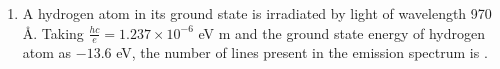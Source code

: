 
\begin{enumerate}
    \item A hydrogen atom in its ground state is irradiated by light of wavelength 970 \AA. Taking $\frac{hc}{e} = 1.237 \times 10^{-6}$ eV m and the ground state energy of hydrogen atom as $-13.6$ eV, the number of lines present in the emission spectrum is \underline{\hspace{2.5 cm}}.
\end{enumerate}
